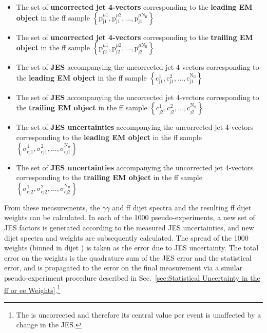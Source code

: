 \documentclass[dissertation.tex]{subfiles}
\begin{document}
\begin{itemize}
  \item The set of \textbf{uncorrected jet 4-vectors} corresponding to the \textbf{leading EM object} in the ff sample $\left\{\mbox{p}_{\mbox{j}1}^{\mu1}, \mbox{p}_{\mbox{j}1}^{\mu2},...,\mbox{p}_{\mbox{j}1}^{\mu \mbox{N}_{\mbox{ff}}}\right\}$
  \item The set of \textbf{uncorrected jet 4-vectors} corresponding to the \textbf{trailing EM object} in the ff sample $\left\{\mbox{p}_{\mbox{j}2}^{\mu1}, \mbox{p}_{\mbox{j}2}^{\mu2},...,\mbox{p}_{\mbox{j}2}^{\mu \mbox{N}_{\mbox{ff}}}\right\}$
  \item The set of \textbf{JES} accompanying the uncorrected jet 4-vectors corresponding to the \textbf{leading EM object} in the ff sample $\left\{\mbox{c}_{\mbox{j}1}^{1}, \mbox{c}_{\mbox{j}1}^{2},...,\mbox{c}_{\mbox{j}1}^{\mbox{N}_{\mbox{ff}}}\right\}$
  \item The set of \textbf{JES} accompanying the uncorrected jet 4-vectors corresponding to the \textbf{trailing EM object} in the ff sample $\left\{\mbox{c}_{\mbox{j}2}^{1}, \mbox{c}_{\mbox{j}2}^{2},...,\mbox{c}_{\mbox{j}2}^{\mbox{N}_{\mbox{ff}}}\right\}$
  \item The set of \textbf{JES uncertainties} accompanying the uncorrected jet 4-vectors corresponding to the \textbf{leading EM object} in the ff sample $\left\{\sigma_{\mbox{cj}1}^{1}, \sigma_{\mbox{cj}1}^{2},...,\sigma_{\mbox{cj}1}^{\mbox{N}_{\mbox{ff}}}\right\}$
  \item The set of \textbf{JES uncertainties} accompanying the uncorrected jet 4-vectors corresponding to the \textbf{trailing EM object} in the ff sample $\left\{\sigma_{\mbox{cj}2}^{1}, \sigma_{\mbox{cj}2}^{2},...,\sigma_{\mbox{cj}2}^{\mbox{N}_{\mbox{ff}}}\right\}$
\end{itemize}
%
From these measurements, the $\gamma\gamma$ and ff dijet \pT spectra and the resulting ff dijet weights can be calculated.  In each of the 1000 pseudo-experiments, a new set of JES factors is generated according to the measured JES uncertainties, and new dijet \pT spectra and weights are subsequently calculated.  The spread of the 1000 weights (binned in dijet \pT) is taken as the error due to JES uncertainty.  The total error on the weights is the quadrature sum of the JES error and the statistical error, and is propagated to the error on the final \MET measurement via a similar pseudo-experiment procedure described in Sec.~\ref{sec:Statistical Uncertainty in the ff or ee Weights}.\footnote{The \MET is uncorrected and therefore its central value per event is unaffected by a change in the JES.}
\end{document}
